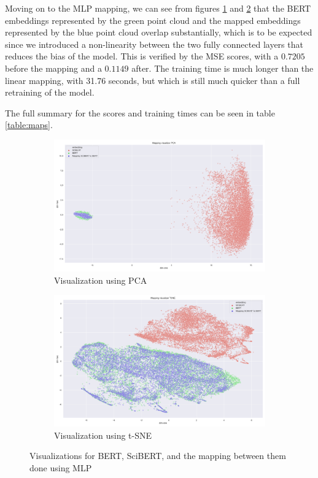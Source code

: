 \documentclass[12pt]{extreport}
\begin{document}
Moving on to the MLP mapping, we can see from figures \ref{fig:mlp-pca} and \ref{fig:mlp-tsne} that the BERT embeddings represented by the green point cloud and the mapped embeddings represented by the blue point cloud overlap substantially, which is to be expected since we introduced a non-linearity between the two fully connected layers that reduces the bias of the model. This is verified by the MSE scores, with a $0.7205$ before the mapping and a $0.1149$ after. The training time is much longer than the linear mapping, with 31.76 seconds, but which is still much quicker than a full retraining of the model.

The full summary for the scores and training times can be seen in table \ref{table:maps}.

\begin{figure}[H]
\centering
\begin{subfigure}{.49\textwidth}
\centering
\includegraphics[width=\linewidth]{assets/addressing-change/mlp_mapping_vis_pca_SCIBERT_BERT_average.png}
\caption{Visualization using PCA}
\label{fig:mlp-pca}
\end{subfigure}
\begin{subfigure}{.49\textwidth}
\centering
\includegraphics[width=\linewidth]{assets/addressing-change/mlp_mapping_vis_tsne_SCIBERT_BERT_average.png}
\caption{Visualization using t-SNE}
\label{fig:mlp-tsne}
\end{subfigure}
\caption{Visualizations for BERT, SciBERT, and the mapping between them done using MLP}
\label{fig:mlp-viz}
\end{figure}
\end{document}
